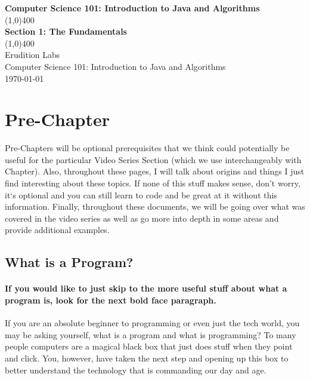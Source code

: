 \documentclass[11]{article}
\begin{document}
\begin{titlepage}
\begin{center}
\vspace{1cm}
\Large{\textbf{Computer Science 101: Introduction to Java and Algorithms}}\\
\vfill
\line(1,0){400}\\
\huge{\textbf{Section 1: The Fundamentals}}\\
\line(1,0){400}\\
\vfill
Erudition Labs\\
Computer Science 101: Introduction to Java and Algorithms\\
\today\\
\end{center}
\end{titlepage}

\tableofcontents
\thispagestyle{empty}
\clearpage
\setcounter{page}{1}

\section{Pre-Chapter}
Pre-Chapters will be optional prerequisites that we think could potentially be useful for the particular Video Series Section (which we use interchangeably with Chapter). Also, throughout these pages, I will talk about origins and things I just find interesting about these topics. If none of this stuff makes sense, don't worry, it`s optional and you can still learn to code and be great at it without this information. Finally, throughout these documents, we will be going over what was covered in the video series as well as go more into depth in some areas and provide additional examples.
\subsection{What is a Program?}
\paragraph{If you would like to just skip to the more useful stuff about what a program is, look for the next bold face paragraph.}
If you are an absolute beginner to programming or even just the tech world, you may be asking yourself, what is a program and what is programming? To many people computers are a magical black box that just does stuff when they point and click. You, however, have taken the next step and opening up this box to better understand the technology that is commanding our day and age.
\end{document}
